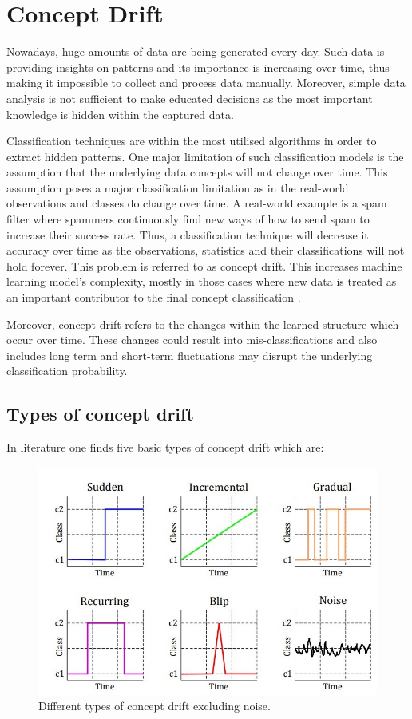 \chapter[Concept Drift]{Concept Drift}
\label{ch:concept-drift}

   Nowadays, huge amounts of data are being generated every day. Such data is providing insights on patterns and its importance is increasing over time, thus making it impossible to collect and process data manually. Moreover, simple data analysis is not sufficient to make educated decisions as the most important knowledge is hidden within the captured data.
   
Classification techniques are within the most utilised algorithms in order to extract hidden patterns. One major limitation of such classification models is the assumption that the underlying data concepts will not change over time. This assumption poses a major classification limitation as in the real-world observations and classes do change over time.  A real-world example is a spam filter where spammers continuously find new ways of how to send spam to increase their success rate.  Thus, a classification technique will decrease it accuracy over time as the observations, statistics and their classifications will not hold forever. This problem is referred to as concept drift. This increases machine learning model's complexity, mostly in those cases where new data is treated as an important contributor to the final concept classification \citep{Bishop:2006:PRM:1162264, Tsymbal04theproblem}. 

Moreover, concept drift refers to the changes within the learned structure which occur over time. These changes could result into mis-classifications and also includes long term and short-term fluctuations may disrupt the underlying classification probability.

\section{Types of concept drift}
In literature one finds five basic types of concept drift which are:

  \begin{figure}[hbt!]
  \centering
      \includegraphics[width=0.88\linewidth]{graphics/concept_drift/concept_drift.jpg}
      \caption{Different types of concept drift excluding noise. \citep{GomezLosada2017}}
      \label{fig:concept-drift-types }
  \end{figure}
  
